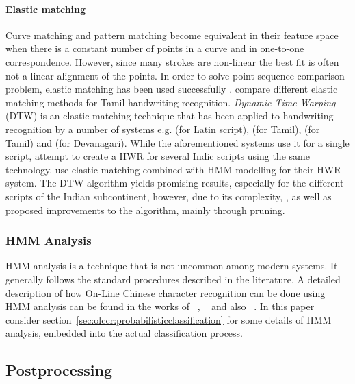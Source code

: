 \paragraph{Elastic matching}
Curve matching and pattern matching become equivalent in their feature space
when there is a constant number of points in a curve and in one-to-one 
correspondence. However, since many strokes are non-linear the best fit is often
not a linear alignment of the points.
In order to solve point sequence comparison problem, elastic matching has 
been used successfully .
 compare different elastic matching methods for Tamil 
handwriting recognition. \emph{Dynamic Time Warping} (DTW) is an elastic 
matching technique that has been applied to handwriting recognition by a number 
of systems e.g.  (for Latin script),  (for Tamil),  (for Tamil) and  (for Devanagari). While the aforementioned systems use it for a single script, 
 attempt to create a HWR for several Indic scripts using 
the same technology. 
 use elastic matching combined with 
HMM modelling for their HWR system. The DTW algorithm yields promising results, 
especially for the different scripts of the Indian subcontinent, however, 
due to its complexity, ,  as well as 
 proposed improvements to the algorithm, 
mainly through pruning.

\subsubsection{HMM Analysis}
\label{sec:hmmanalysis}

HMM analysis is a technique that is not uncommon among modern systems.
It generally follows the standard procedures described in the literature.
A detailed description of how On-Line Chinese character recognition can be
done using HMM analysis can be found in the works of 
~\citeyear{Hu2000},
~\citeyear{Hu1996} and also 
~\citeyear{BahlmannBurkhardt2004}.
In this paper consider section~\ref{sec:olccr:probabilisticclassification} for
some details of HMM analysis, embedded into the actual classification process.

\subsection{Postprocessing}
\label{sec:postprocessing}

